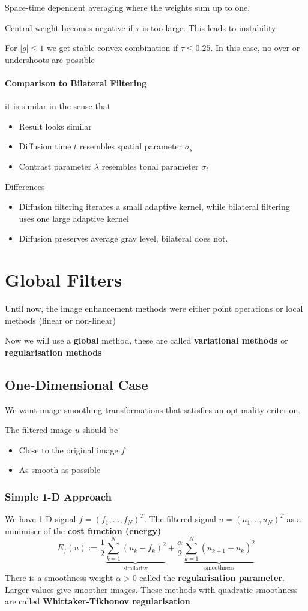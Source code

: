 \documentclass{article}
\begin{document}
Space-time dependent averaging where the weights sum up to one.

Central weight becomes negative if $\tau$ is too large. This leads to instability

For $|g| \leq 1$ we get stable convex combination if $\tau \leq 0.25$. In this case, no over or undershoots are possible 

\paragraph{Comparison to Bilateral Filtering}

it is similar in the sense that
\begin{itemize}
  \item Result looks similar
  \item Diffusion time $t$ resembles spatial parameter $\sigma_s$
  \item Contrast parameter $\lambda$ resembles tonal parameter $\sigma_t$
\end{itemize}
Differences
\begin{itemize}
  \item Diffusion filtering iterates a small adaptive kernel, while bilateral filtering uses one large adaptive kernel
  \item Diffusion preserves average gray level, bilateral does not.
\end{itemize}
\section{Global Filters}
Until now, the image enhancement methods were either point operations or local methods (linear or non-linear)

Now we will use a \textbf{global} method, these are called \textbf{variational methods} or \textbf{regularisation methods}

\subsection{One-Dimensional Case}
We want image smoothing transformations that satisfies an optimality criterion.

The filtered image $u$ should be
\begin{itemize}
  \item Close to the original image $f$
  \item As smooth as possible
\end{itemize}
\subsubsection{Simple 1-D Approach}
We have 1-D signal $f=(f_1,...,f_N)^T$. The filtered signal $u=(u_1,..,u_N)^T$ as a minimiser of the \textbf{cost function (energy)}
\[E_f(u) := \frac{1}{2}\underbrace{\sum_{k=1}^N(u_k-f_k)^2}_{\text{similarity}}  + \frac{\alpha}{2}\underbrace{\sum_{k=1}^N(u_{k+1}-u_k)^2}_{\text{smoothness}}\]
There is a smoothness weight $\alpha > 0$ called the \textbf{regularisation parameter}. Larger values give smoother images. These methods with quadratic smoothness are called \textbf{Whittaker-Tikhonov regularisation}
\end{document}
